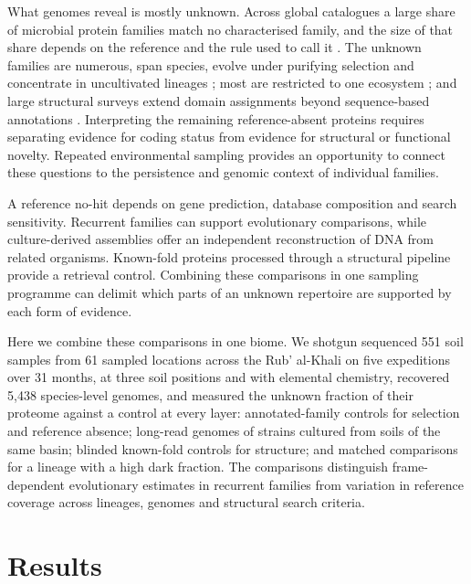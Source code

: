 \documentclass[11pt]{article}
\begin{document}
What genomes reveal is mostly unknown. Across global catalogues a large share of microbial protein
families match no characterised family, and the size of that share depends on the reference and
the rule used to call it \citep{pavlopoulos2023darkmatter,vanni2022agnostos,coelho2022gmgc}. The
unknown families are numerous, span species, evolve under purifying selection and concentrate in
uncultivated lineages \citep{rodriguezdelrio2024fesnov}; most are restricted to one ecosystem
\citep{aplakidou2025quadrupling}; and large structural surveys extend domain assignments beyond sequence-based annotations
\citep{lau2024ted,yeo2025afesm}. Interpreting the remaining reference-absent proteins requires
separating evidence for coding status from evidence for structural or functional novelty.
Repeated environmental sampling provides an opportunity to connect these questions to the
persistence and genomic context of individual families.

A reference no-hit depends on gene prediction, database composition and search sensitivity.
Recurrent families can support evolutionary comparisons, while culture-derived assemblies offer
an independent reconstruction of DNA from related organisms. Known-fold proteins processed
through a structural pipeline provide a retrieval control. Combining these comparisons in one
sampling programme can delimit which parts of an unknown repertoire are supported by each
form of evidence.

Here we combine these comparisons in one biome. We shotgun sequenced 551 soil samples from 61 sampled locations across
the Rub' al-Khali on five expeditions over 31 months, at three soil positions and with elemental
chemistry, recovered 5{,}438 species-level genomes, and measured the unknown fraction of their
proteome against a control at every layer: annotated-family controls for selection and
reference absence; long-read genomes of strains cultured from soils of the same basin; blinded
known-fold controls for structure; and matched comparisons for a lineage with a high dark fraction. The
comparisons distinguish frame-dependent evolutionary estimates in recurrent families from variation in
reference coverage across lineages, genomes and structural search criteria.

\section*{Results}
\end{document}
